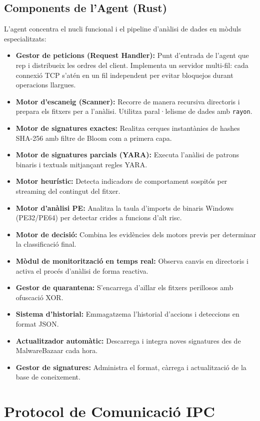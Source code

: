 \documentclass[12pt,a4paper]{report}
\begin{document}
\subsection{Components de l'Agent (Rust)}
L'agent concentra el nucli funcional i el pipeline d'anàlisi de dades en mòduls especialitzats:
\begin{itemize}
    \item \textbf{Gestor de peticions (Request Handler):} Punt d'entrada de l'agent que rep i distribueix les ordres del client. Implementa un servidor multi-fil: cada connexió TCP s'atén en un fil independent per evitar bloquejos durant operacions llargues.
    \item \textbf{Motor d'escaneig (Scanner):} Recorre de manera recursiva directoris i prepara els fitxers per a l'anàlisi. Utilitza paral·lelisme de dades amb \texttt{rayon}.
    \item \textbf{Motor de signatures exactes:} Realitza cerques instantànies de hashes SHA-256 amb filtre de Bloom com a primera capa.
    \item \textbf{Motor de signatures parcials (YARA):} Executa l'anàlisi de patrons binaris i textuals mitjançant regles YARA.
    \item \textbf{Motor heurístic:} Detecta indicadors de comportament sospitós per streaming del contingut del fitxer.
    \item \textbf{Motor d'anàlisi PE:} Analitza la taula d'imports de binaris Windows (PE32/PE64) per detectar crides a funcions d'alt risc.
    \item \textbf{Motor de decisió:} Combina les evidències dels motors previs per determinar la classificació final.
    \item \textbf{Mòdul de monitorització en temps real:} Observa canvis en directoris i activa el procés d'anàlisi de forma reactiva.
    \item \textbf{Gestor de quarantena:} S'encarrega d'aïllar els fitxers perillosos amb ofuscació XOR.
    \item \textbf{Sistema d'historial:} Emmagatzema l'historial d'accions i deteccions en format JSON.
    \item \textbf{Actualitzador automàtic:} Descarrega i integra noves signatures des de MalwareBazaar cada hora.
    \item \textbf{Gestor de signatures:} Administra el format, càrrega i actualització de la base de coneixement.
\end{itemize}

\section{Protocol de Comunicació IPC}
\end{document}
